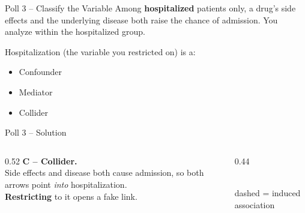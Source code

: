 \documentclass[aspectratio=169]{beamer}
\begin{document}
\begin{frame}{Poll 3 \;--\; Classify the Variable}
  \small
  Among \textbf{hospitalized} patients only, a drug's side effects and the
  underlying disease both raise the chance of admission. You analyze within
  the hospitalized group.
  \vspace{0.8em}

  Hospitalization (the variable you restricted on) is a:
  \begin{itemize}
    \item[\textbf{A.}] Confounder
    \item[\textbf{B.}] Mediator
    \item[\textbf{C.}] Collider
  \end{itemize}
\end{frame}

\begin{frame}{Poll 3 \;--\; Solution}
  \small
  \begin{columns}[T]
    \begin{column}{0.52\textwidth}
      \textcolor{good}{\textbf{C -- Collider.}}\\[0.4em]
      Side effects and disease both cause admission, so both arrows point
      \emph{into} hospitalization.\\[0.4em]
      \textcolor{brick}{\textbf{Restricting}} to it opens a fake link.
    \end{column}
    \begin{column}{0.44\textwidth}
      \centering
      \\[0.3em]
      {\scriptsize\textcolor{brick}{dashed = induced association}}
    \end{column}
  \end{columns}
\end{frame}
\end{document}
